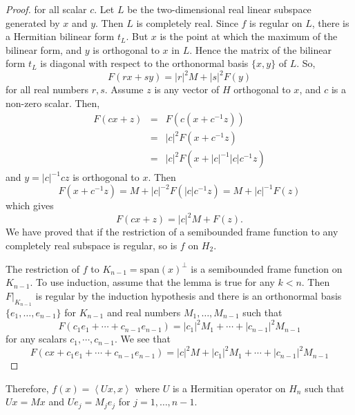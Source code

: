 \begin{lemma}
\begin{proof}
        for all scalar \(c\). Let \(L\) be the two-dimensional real linear subspace generated by \(x\) and \(y\). Then \(L\) is completely real. Since \(f\) is regular on \(L\), there is a Hermitian bilinear form \(t_L\). But \(x\) is the point at which the maximum of the bilinear form, and \(y\) is orthogonal to \(x\) in \(L\). Hence the matrix of the bilinear form \(t_L\) is diagonal with respect to the orthonormal basis \(\{x,y\}\) of \(L\). So,
        \[F(rx+sy)=\left \lvert r \right \rvert^2 M + \left \lvert s \right \rvert^2 F(y)\]
        for all real numbers \(r,s\). Assume \(z\) is any vector of \(H\) orthogonal to \(x\), and \(c\) is a non-zero scalar. Then,
        \begin{eqnarray*}
            F(cx+z) &= & F(c(x+c^{-1}z)) \\
            &=& \left \lvert c \right \rvert^2 F(x+c^{-1}z) \\
            &=& \left \lvert c \right \rvert^2 F(x+\left \lvert c \right \rvert^{-1}\left \lvert c \right \rvert c^{-1}z)
        \end{eqnarray*}
        and \(y=\left \lvert c \right \rvert^{-1}cz\) is orthogonal to \(x\). Then
        \[F(x+c^{-1}z)=M+\left \lvert c \right \rvert^{-2}F(\left \lvert c \right \rvert c^{-1}z )=M + \left \lvert c \right \rvert^{-1}F(z)\]
        which gives \[F(cx+z)=\left \lvert c \right \rvert^2 M + F(z).\]
        We have proved that if the restriction of a semibounded frame function to any completely real subspace is regular, so is \(f\) on \(H_2\).

        The restriction of \(f\) to \(K_{n-1}=\mathrm{span}(x)^\perp\) is a semibounded frame function on \(K_{n-1}\). To use induction, assume that the lemma is true for any \(k<n\). Then \(F \rvert_{K_{n-1}}\) is regular by the induction hypothesis and there is an orthonormal basis \(\{e_1,\dots,e_{n-1}\}\) for \(K_{n-1}\) and real numbers \(M_1,\dots,M_{n-1}\) such that
        \[F(c_1e_1 +\cdots + c_{n-1}e_{n-1})= \left \lvert c_1 \right \rvert^2 M_1 + \cdots + \left \lvert c_{n-1} \right \rvert^2 M_{n-1} \]
        for any scalars \(c_1,\cdots,c_{n-1}\). We see that
        \[F(cx+c_1e_1 + \cdots + c_{n-1}e_{n-1})=\left \lvert c \right \rvert^2 M + \left \lvert c_1 \right \rvert^2 M_1 + \cdots + \left \lvert c_{n-1} \right \rvert^2 M_{n-1}\]
    \end{proof}
    Therefore, \(f(x)=\left \langle Ux,x \right \rangle\) where \(U\) is a Hermitian operator on \(H_n\) such that \(Ux=Mx\) and \(Ue_j = M_je_j\) for \(j=1,\dots,n-1\).
    \end{lemma}


